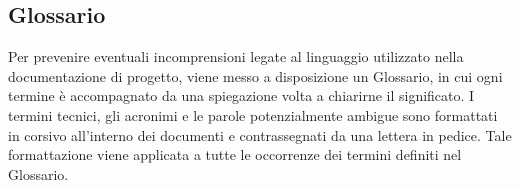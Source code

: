\subsection{Glossario}
\label{subsec:glossario}
Per prevenire eventuali incomprensioni legate al linguaggio utilizzato nella documentazione di progetto, viene messo a disposizione un Glossario, in cui ogni termine è accompagnato da una spiegazione volta a chiarirne il significato. 
I termini tecnici, gli acronimi e le parole potenzialmente ambigue sono formattati in corsivo all'interno dei documenti e contrassegnati da una lettera \glossario{ } in pedice. 
Tale formattazione viene applicata a tutte le occorrenze dei termini definiti nel Glossario.